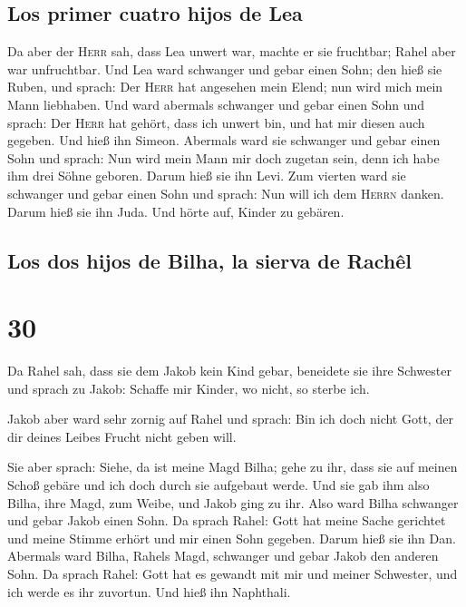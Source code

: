 \hypertarget{los-primer-cuatro-hijos-de-lea}{%
\subsection{Los primer cuatro hijos de
Lea}\label{los-primer-cuatro-hijos-de-lea}}

 Da aber der \textsc{Herr} sah, dass Lea unwert war,
machte er sie fruchtbar; Rahel aber war unfruchtbar.  Und
Lea ward schwanger und gebar einen Sohn; den hieß sie Ruben, und sprach:
Der \textsc{Herr} hat angesehen mein Elend; nun wird mich mein Mann
liebhaben.  Und ward abermals schwanger und gebar einen
Sohn und sprach: Der \textsc{Herr} hat gehört, dass ich unwert bin, und
hat mir diesen auch gegeben. Und hieß ihn Simeon. 
Abermals ward sie schwanger und gebar einen Sohn und sprach: Nun wird
mein Mann mir doch zugetan sein, denn ich habe ihm drei Söhne geboren.
Darum hieß sie ihn Levi.  Zum vierten ward sie schwanger
und gebar einen Sohn und sprach: Nun will ich dem \textsc{Herrn} danken.
Darum hieß sie ihn Juda. Und hörte auf, Kinder zu gebären.

\hypertarget{los-dos-hijos-de-bilha-la-sierva-de-rachuxeal}{%
\subsection{Los dos hijos de Bilha, la sierva de
Rachêl}\label{los-dos-hijos-de-bilha-la-sierva-de-rachuxeal}}

\hypertarget{section-29}{%
\section{30}\label{section-29}}

 Da Rahel sah, dass sie dem Jakob kein Kind gebar,
beneidete sie ihre Schwester und sprach zu Jakob: Schaffe mir Kinder, wo
nicht, so sterbe ich.

 Jakob aber ward sehr zornig auf Rahel und sprach: Bin ich
doch nicht Gott, der dir deines Leibes Frucht nicht geben will.

 Sie aber sprach: Siehe, da ist meine Magd Bilha; gehe zu
ihr, dass sie auf meinen Schoß gebäre und ich doch durch sie aufgebaut
werde.  Und sie gab ihm also Bilha, ihre Magd, zum Weibe,
und Jakob ging zu ihr.  Also ward Bilha schwanger und
gebar Jakob einen Sohn.  Da sprach Rahel: Gott hat meine
Sache gerichtet und meine Stimme erhört und mir einen Sohn gegeben.
Darum hieß sie ihn Dan.  Abermals ward Bilha, Rahels Magd,
schwanger und gebar Jakob den anderen Sohn.  Da sprach
Rahel: Gott hat es gewandt mit mir und meiner Schwester, und ich werde
es ihr zuvortun. Und hieß ihn Naphthali.

